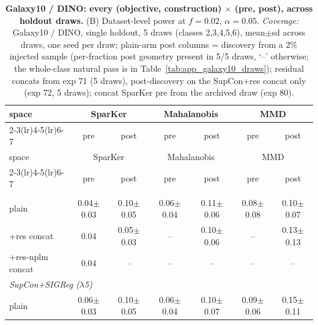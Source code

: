 \begin{center}
\small
\begin{longtable}{lcccccc}
\caption{\textbf{Galaxy10 / DINO: every (objective, construction) $\times$ (pre, post), across holdout draws.} (B) Dataset-level power at $f=0.02$, $\alpha=0.05$. \emph{Coverage:} Galaxy10 / DINO, single holdout, 5 draws (classes 2,3,4,5,6), mean$\pm$sd across draws, one seed per draw; plain-arm post columns = discovery from a 2\% injected sample (per-fraction post geometry present in 5/5 draws, `--' otherwise; the whole-class natural pass is in Table~\ref{tab:app_galaxy10_draws}); residual concats from exp 71 (5 draws), post-discovery on the SupCon+res concat only (exp 72, 5 draws); concat SparKer pre from the archived draw (exp 80).}\label{tab:grid_galaxy10_dino_b}\\
\toprule
space & \multicolumn{2}{c}{SparKer} & \multicolumn{2}{c}{Mahalanobis} & \multicolumn{2}{c}{MMD} \\
\cmidrule(lr){2-3}\cmidrule(lr){4-5}\cmidrule(lr){6-7}
& pre & post & pre & post & pre & post \\
\midrule
\endfirsthead
\toprule
space & \multicolumn{2}{c}{SparKer} & \multicolumn{2}{c}{Mahalanobis} & \multicolumn{2}{c}{MMD} \\
\cmidrule(lr){2-3}\cmidrule(lr){4-5}\cmidrule(lr){6-7}
& pre & post & pre & post & pre & post \\
\midrule
\endhead
\bottomrule
\endfoot
\multicolumn{7}{l}{\emph{SupCon}} \\
\quad plain & 0.04$\pm$0.03 & 0.10$\pm$0.05 & 0.06$\pm$0.04 & 0.11$\pm$0.06 & 0.08$\pm$0.08 & 0.10$\pm$0.07 \\
\quad +res concat & 0.04 & 0.05$\pm$0.03 & -- & 0.10$\pm$0.06 & -- & 0.13$\pm$0.13 \\
\quad +res-nplm concat & 0.04 & -- & -- & -- & -- & -- \\
\multicolumn{7}{l}{\emph{SupCon+SIGReg ($\lambda$5)}} \\
\quad plain & 0.06$\pm$0.03 & 0.10$\pm$0.05 & 0.06$\pm$0.04 & 0.10$\pm$0.07 & 0.09$\pm$0.06 & 0.15$\pm$0.11 \\

\end{longtable}
\end{center}
